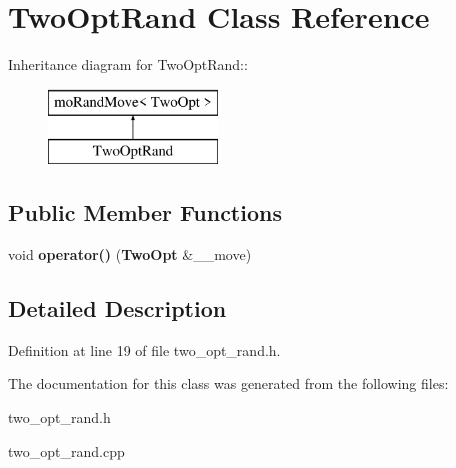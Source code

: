 \section{TwoOptRand Class Reference}
\label{class_two_opt_rand}
Inheritance diagram for TwoOptRand::\begin{figure}[H]
\begin{center}
\leavevmode
\includegraphics[height=2cm]{class_two_opt_rand}
\end{center}
\end{figure}
\subsection*{Public Member Functions}
\begin{CompactItemize}
\item 
void {\bf operator()} ({\bf TwoOpt} \&\_\-\_\-move)\label{class_two_opt_rand_bcba673ec71e565f536674bfe5bab609}

\end{CompactItemize}


\subsection{Detailed Description}




Definition at line 19 of file two\_\-opt\_\-rand.h.

The documentation for this class was generated from the following files:\begin{CompactItemize}
\item 
two\_\-opt\_\-rand.h\item 
two\_\-opt\_\-rand.cpp\end{CompactItemize}

